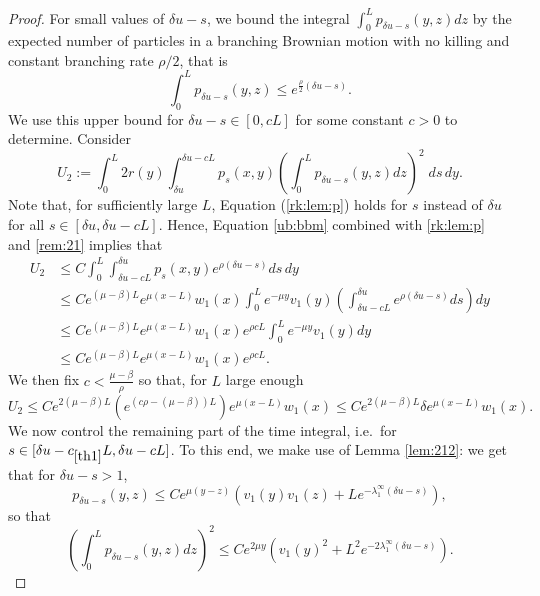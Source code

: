\documentclass[11pt]{article}
\theoremstyle{plain}
\newcommand\linf{\lambda_1^\infty}
\begin{document}
\begin{proof}
 For small values of $\delta u -s$, we bound the integral $\int_0^Lp_{\delta u-s}(y,z) dz$ by the expected number of particles in a branching Brownian motion with no killing and constant branching rate $\rho/2$, that is
\begin{equation}
\label{ub:bbm}
\int_0^Lp_{\delta u -s}(y,z)\leqslant e^{\frac{\rho}{2}(\delta u -s)}.
\end{equation}
We use this upper bound  for $\delta u-s\in[0,cL]$ for some constant $c>0$ to determine. Consider
\begin{equation*}
U_2:= \int_0^L 2r(y)\int_{\delta u}^{\delta u -c  L}p_s(x,y)\left(\int_0^Lp_{\delta u-s}(y,z) dz\right)^2\;ds \,dy.
\end{equation*}
Note that, for sufficiently large $L$, Equation (\ref{rk:lem:p}) holds for $s$ instead of $\delta u$ for all $s\in[\delta u, \delta u-cL]$. Hence, Equation \eqref{ub:bbm} combined with \eqref{rk:lem:p} and \eqref{rem:21} implies that 
\begin{align*}
U_2&\leqslant C\int_0^L \int_{\delta u-c L}^{\delta u} p_s(x,y) e^{\rho (\delta u-s)}ds\, dy\\
&\leqslant  Ce^{(\mu-\beta)L}e^{\mu(x-L)}w_1(x)\int_0^L e^{-\mu y}v_1(y)\left(\int_{\delta u -c L}^{\delta u}e^{\rho (\delta u-s)}ds \right)dy\\
&\leqslant  Ce^{(\mu-\beta)L}e^{\mu(x-L)}w_1(x)e^{\rho c L}\int_0^L e^{-\mu y}v_1(y)dy\\
 &\leqslant  C e^{(\mu-\beta)L}e^{\mu(x-L)}w_1(x)e^{\rho c L}.
\end{align*}
We then fix $c<\frac {\mu-\beta}{\rho}$ so that, for $L$ large enough 
\begin{equation}
U_2\leqslant C e^{2(\mu-\beta)L}\left(e^{(c\rho -(\mu-\beta))L}\right)e^{\mu(x-L)}w_1(x)\leqslant C e^{2(\mu-\beta)L}\delta e^{\mu(x-L)}w_1(x). \label{est:A2:N}
\end{equation}
 We now control the remaining part of the time integral, i.e.~for $s\in [\delta u-c_{\ref{th1}}L, \delta u -cL]$. 
To this end, we make use of Lemma \ref{lem:212}: we get that for $\delta u-s>1$,\begin{equation*}
p_{\delta u-s}(y,z)\leqslant Ce^{\mu(y-z)}\left(v_1(y)v_1(z)+Le^{-\linf (\delta u-s) }\right),
\end{equation*}
so that 
\begin{equation}\label{ub:int2}
\left(\int_0^L p_{\delta u-s}(y,z) dz\right)^2\leqslant Ce^{2\mu y}\left(v_1(y)^2+L^2e^{-2\linf (\delta u-s)}\right).
\end{equation}

\end{proof}
\end{document}
